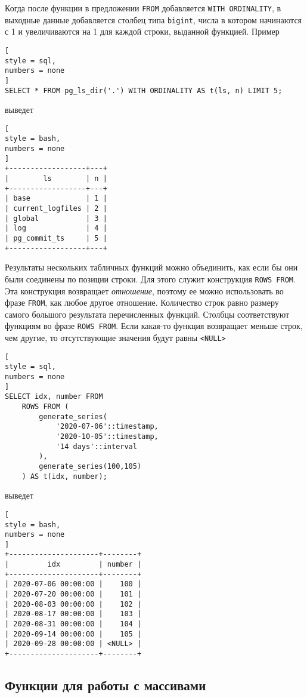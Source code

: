 \documentclass[%
	11pt,
	a4paper,
	utf8,
		]{article}
\begin{document}
Когда после функции в предложении \texttt{FROM} добавляется \texttt{WITH ORDINALITY}, в выходные данные добавляется столбец типа \texttt{bigint}, числа в котором начинаются с 1 и увеличиваются на 1 для каждой строки, выданной функцией. Пример
\begin{lstlisting}[
style = sql,
numbers = none
]
SELECT * FROM pg_ls_dir('.') WITH ORDINALITY AS t(ls, n) LIMIT 5;
\end{lstlisting}
выведет
\begin{lstlisting}[
style = bash,
numbers = none
]
+------------------+---+
|        ls        | n |
+------------------+---+
| base             | 1 |
| current_logfiles | 2 |
| global           | 3 |
| log              | 4 |
| pg_commit_ts     | 5 |
+------------------+---+
\end{lstlisting}

Результаты нескольких табличных функций можно объединить, как если бы они были соединены по позиции строки. Для этого служит конструкция \texttt{ROWS FROM}. Эта конструкция возвращает \emph{отношение}, поэтому ее можно использовать во фразе \texttt{FROM}, как любое другое отношение. Количество строк равно размеру самого большого результата перечисленных функций. Столбцы соответствуют функциям во фразе \texttt{ROWS FROM}. Если какая-то функция возвращает меньше строк, чем другие, то отсутствующие значения будут равны \texttt{<NULL>}
\begin{lstlisting}[
style = sql,
numbers = none
]
SELECT idx, number FROM
    ROWS FROM (
        generate_series(
            '2020-07-06'::timestamp,
            '2020-10-05'::timestamp,
            '14 days'::interval
        ),
        generate_series(100,105)
    ) AS t(idx, number);
\end{lstlisting}
выведет
\begin{lstlisting}[
style = bash,
numbers = none
]
+---------------------+--------+
|         idx         | number |
+---------------------+--------+
| 2020-07-06 00:00:00 |    100 |
| 2020-07-20 00:00:00 |    101 |
| 2020-08-03 00:00:00 |    102 |
| 2020-08-17 00:00:00 |    103 |
| 2020-08-31 00:00:00 |    104 |
| 2020-09-14 00:00:00 |    105 |
| 2020-09-28 00:00:00 | <NULL> |
+---------------------+--------+
\end{lstlisting}


\subsection{Функции для работы с массивами}
\end{document}
